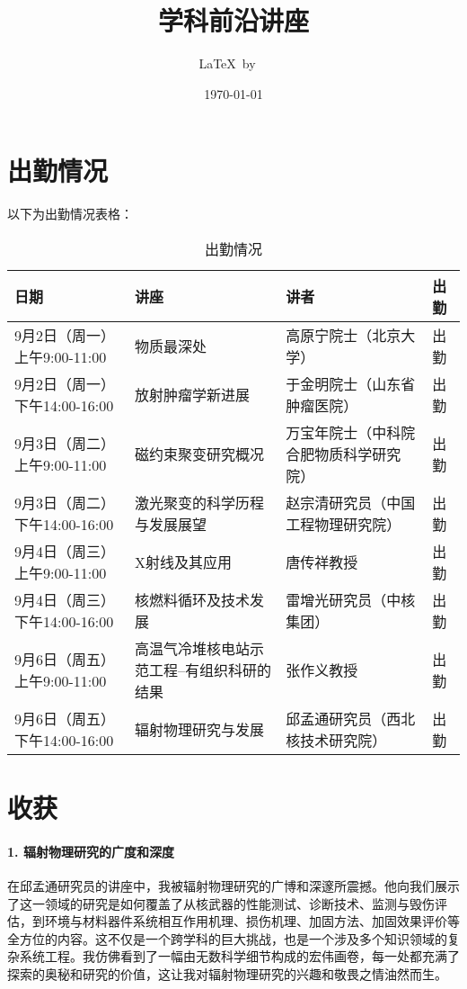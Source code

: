 \documentclass[UTF8]{ctexart}
\title{学科前沿讲座}
\author{\LaTeX\ by\ \ }
\date{\today}
\begin{document}
\fancyfoot[C]{\thepage}

\maketitle
\tableofcontents

\section{出勤情况}

以下为出勤情况表格：

\begin{table}[h]
    \centering
    \begin{tabular}{|p{3cm}|p{5cm}|p{5cm}|p{1cm}|}
    \hline
    日期 & 讲座 & 讲者 & 出勤 \\
    \hline
    9月2日（周一）上午9:00-11:00 & 物质最深处 & 高原宁院士（北京大学） & 出勤 \\
    \hline
    9月2日（周一）下午14:00-16:00 & 放射肿瘤学新进展 & 于金明院士（山东省肿瘤医院） & 出勤 \\
    \hline
    9月3日（周二）上午9:00-11:00 & 磁约束聚变研究概况 & 万宝年院士（中科院合肥物质科学研究院） & 出勤 \\
    \hline
    9月3日（周二）下午14:00-16:00 & 激光聚变的科学历程与发展展望 & 赵宗清研究员（中国工程物理研究院） & 出勤 \\
    \hline
    9月4日（周三）上午9:00-11:00 & X射线及其应用 & 唐传祥教授 & 出勤 \\
    \hline
    9月4日（周三）下午14:00-16:00 & 核燃料循环及技术发展 & 雷增光研究员（中核集团） & 出勤 \\
    \hline
    9月6日（周五）上午9:00-11:00 & 高温气冷堆核电站示范工程--有组织科研的结果 & 张作义教授 & 出勤 \\
    \hline
    9月6日（周五）下午14:00-16:00 & 辐射物理研究与发展 & 邱孟通研究员（西北核技术研究院） & 出勤 \\
    \hline
    \end{tabular}
    \caption{出勤情况}
\end{table}

\section{收获}

\paragraph{1. 辐射物理研究的广度和深度}
在邱孟通研究员的讲座中，我被辐射物理研究的广博和深邃所震撼。他向我们展示了这一领域的研究是如何覆盖了从核武器的性能测试、诊断技术、监测与毁伤评估，到环境与材料器件系统相互作用机理、损伤机理、加固方法、加固效果评价等全方位的内容。这不仅是一个跨学科的巨大挑战，也是一个涉及多个知识领域的复杂系统工程。我仿佛看到了一幅由无数科学细节构成的宏伟画卷，每一处都充满了探索的奥秘和研究的价值，这让我对辐射物理研究的兴趣和敬畏之情油然而生。
\end{document}
